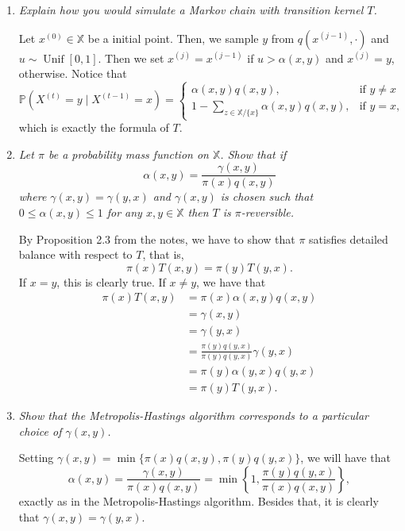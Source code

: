 \documentclass[a4paper,12pt]{article}
\newcommand{\unif}{\operatorname{Unif}}
\newcommand{\pr}{\mathbb{P}}
\theoremstyle{definition}
\begin{document}
\begin{enumerate}
    \item {\it Explain how you would simulate a Markov chain with transition kernel $T$.}
    
    Let $x^{(0)} \in \mathbb{X}$ be a initial point. Then, we sample $y$
    from $q(x^{(j-1)}, \cdot)$ and $u \sim \unif[0,1]$. Then we set $x^{(j)} =
    x^{(j-1)}$ if $u > \alpha(x,y)$ and $x^{(j)} = y$, otherwise. Notice that 
    \begin{equation*}
        \pr(X^{(t)} = y \mid X^{(t-1)} = x) = \begin{cases}
            \alpha(x,y)q(x,y), &\text{if } y \neq x \\
            1 - \sum_{z \in \mathbb{X} / \{x\}} \alpha(x,y)q(x,y), &\text{if } y = x,
        \end{cases}
    \end{equation*}
    which is exactly the formula of $T$.
    
    \item {\it Let $\pi$ be a probability mass function on $\mathbb{X}$. Show
    that if $$\alpha(x, y) = \frac{\gamma(x,y)}{\pi(x)q(x,y)}$$
    where $\gamma(x, y) = \gamma(y, x)$ and $\gamma(x, y)$ is chosen such that
    $0 \le \alpha (x, y) \le 1$ for any $x, y \in \mathbb{X}$ then $T$ is
    $\pi$-reversible.}

    By Proposition 2.3 from the notes, we have to show that 
    $\pi$ satisfies detailed balance with respect to $T$,
    that is, 
    $$
    \pi(x)T(x,y) = \pi(y)T(y,x).
    $$
    If $x = y$, this is clearly true. If $x \neq y$, we have that 
    \begin{equation*}
        \begin{split}
            \pi(x)T(x,y) &= \pi(x)\alpha(x,y)q(x,y) \\
            &= \gamma(x,y) \\ 
            &= \gamma(y,x) \\
            &= \frac{\pi(y)q(y,x)}{\pi(y)q(y,x)}\gamma(y,x) \\
            &= \pi(y)\alpha(y,x)q(y,x) \\
            &= \pi(y)T(y,x).
        \end{split}
    \end{equation*}

    \item {\it Show that the Metropolis-Hastings algorithm corresponds to a particular choice of $\gamma(x, y)$.}

    Setting $\gamma(x,y) = \min\{\pi(x)q(x,y), \pi(y)q(y,x)\}$, we will 
    have that 
    $$
    \alpha(x,y) = \frac{\gamma(x,y)}{\pi(x)q(x,y)} = \min\left\{1, 
    \frac{\pi(y)q(y,x)}{\pi(x)q(x,y)}\right\},
    $$
    exactly as in the Metropolis-Hastings algorithm. Besides that, 
    it is clearly that $\gamma(x,y) = \gamma(y,x)$. 


\end{enumerate}
\end{document}
